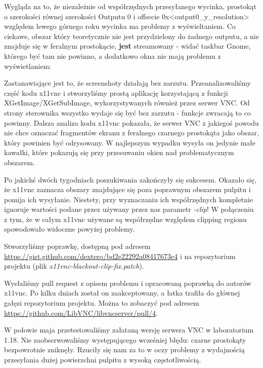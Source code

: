     Wygląda na to, że niezależnie od współrzędnych przesyłanego wycinka, prostokąt o szerokości równej szerokości Outputu 0 i offsecie 0x<output0\_y\_resolution> względem lewego górnego roku wycinka ma problemy z wyświeltaniem. Co ciekawe, obszar który teoretycznie nie jest przydzielony do żadnego outputu, a nie znajduje się w feralnym prostokącie, \textbf{jest} streamowany - widać taskbar Gnome, którego być tam nie powinno, a dodatkowo okna nie mają problemu z wyświetlaniem:

    Zastanawiające jest to, że screenshoty działają bez zarzutu. Przeanalizowaliśmy część kodu x11vnc i stworzyliśmy prostą aplikację korzystającą z funkcji XGetImage/XGetSubImage, wykorzystywanych również przez serwer VNC. Od strony sterownika wszystko wydaje się być bez zarzutu - funkcje zwracają to co powinny. Dalsza analiza kodu x11vnc pokazała, że serwer VNC z jakiegoś powodu nie chce oznaczać fragmentów ekranu z feralnego czarnego prostokąta jako obszar, który powinien być odrysowany. W najlepszym wypadku wysyła on jedynie małe kawałki, które pokazują się przy przesuwaniu okien nad problematycznym obszarem.

    Po jakichś dwóch tygodniach poszukiwania zakończyły się sukcesem. Okazało się, że x11vnc zaznacza obszary znajdujące się poza poprawnym obszarem pulpitu i pomija ich wysyłanie. Niestety, przy wyznaczaniu ich współrzędnych kompletnie ignoruje wartości podane przez używany przez nas parametr \emph{-clip}! W połączeniu z tym, że w całym x11vnc używane są współrzędne względem clipping regionu spowodowało widoczne powyżej problemy.

    Stworzyliśmy poprawkę, dostępną pod adresem \url{https://gist.github.com/dextero/bd2e22292a08417673e4} i na repozytorium projektu (plik \emph{x11vnc-blackout-clip-fix.patch}).

    Wysłaliśmy pull request z opisem problemu i opracowaną poprawką do autorów x11vnc. Po kilku dniach został on zaakceptowany, a łatka trafiła do głównej gałęzi repozytorium projektu. Można to zobaczyć pod adresem \url{https://github.com/LibVNC/libvncserver/pull/4}.

    W połowie maja przetestowaliśmy załataną wersję serwera VNC w laboratorium 1.18. Nie zaobserwowaliśmy występującego wcześniej błędu: czarne prostokąty bezpowrotnie zniknęły. Rzuciły się nam za to w oczy problemy z wydajnością przesyłania dużej powierzchni pulpitu z wysoką częstotliwością.

    \vfill
    \pagebreak

